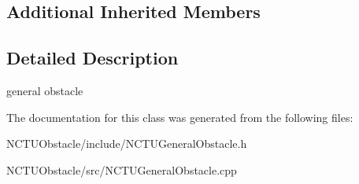 \subsection*{Additional Inherited Members}


\subsection{Detailed Description}
general obstacle 

The documentation for this class was generated from the following files\+:\begin{DoxyCompactItemize}
\item 
N\+C\+T\+U\+Obstacle/include/N\+C\+T\+U\+General\+Obstacle.\+h\item 
N\+C\+T\+U\+Obstacle/src/N\+C\+T\+U\+General\+Obstacle.\+cpp\end{DoxyCompactItemize}
